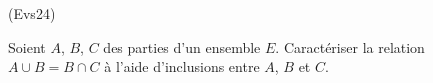 \begin{tiny}(Evs24)\end{tiny} Soient $A$, $B$, $C$ des parties d'un ensemble $E$. Caractériser la relation $A \cup B = B \cap C$
à l'aide d'inclusions entre $A$, $B$ et $C$.